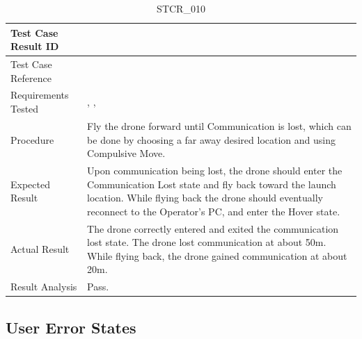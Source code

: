 \documentclass[12pt, titlepage]{article}
\begin{document}
\begin{table}[!h]
\begin{center}
\caption {STCR\_010}
\label{tab:STCR_010}
\begin{tabular}{ | m{3.2cm} | m{12.2cm} | } 
\hline
Test Case Result ID & \nameref{tab:STCR_010} \\ 
\hline
Test Case Reference & \nameref{tab:STC_010}  \\ 
\hline
Requirements Tested & \nameref{SR_007}, \nameref{STA_010}, \nameref{TRANS_010} \\

\hline
Procedure & Fly the drone forward until Communication is lost, which can be done by choosing a far away desired location and using Compulsive Move.   \\
\hline
Expected Result & Upon communication being lost, the drone should enter the Communication Lost state and fly back toward the launch location. While flying back the drone should eventually reconnect to the Operator's PC, and enter the Hover state.    \\ 
\hline
Actual Result & The drone correctly entered and exited the communication lost state. The drone lost communication at about 50m. While flying back, the drone gained communication at about 20m. \\
\hline
Result Analysis & Pass.  \\ 
\hline
\end{tabular}
\end{center}
\end{table}

\clearpage

\subsection{User Error States}
\end{document}
